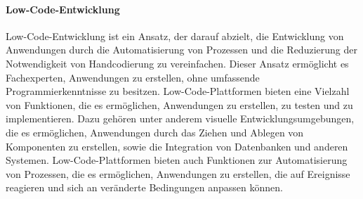 
\paragraph{Low-Code-Entwicklung}
Low-Code-Entwicklung ist ein Ansatz, der darauf abzielt, die Entwicklung von Anwendungen
durch die Automatisierung von Prozessen und die Reduzierung der Notwendigkeit von
Handcodierung zu vereinfachen. Dieser Ansatz ermöglicht es Fachexperten, Anwendungen
zu erstellen, ohne umfassende Programmierkenntnisse zu besitzen. Low-Code-Plattformen
bieten eine Vielzahl von Funktionen, die es ermöglichen, Anwendungen zu erstellen, zu
testen und zu implementieren. Dazu gehören unter anderem visuelle Entwicklungsumgebungen,
die es ermöglichen, Anwendungen durch das Ziehen und Ablegen von Komponenten zu erstellen,
sowie die Integration von Datenbanken und anderen Systemen. Low-Code-Plattformen bieten
auch Funktionen zur Automatisierung von Prozessen, die es ermöglichen, Anwendungen zu
erstellen, die auf Ereignisse reagieren und sich an veränderte Bedingungen anpassen können.

